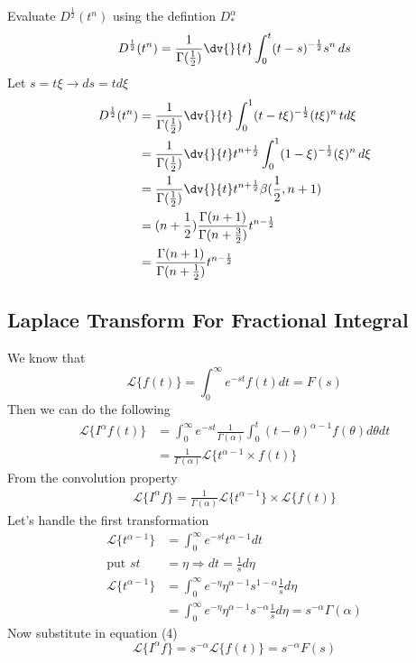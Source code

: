 \begin{example}
    Evaluate $D^{\frac{1}{2}}(t^n)$ using the defintion $D_{*}^{\alpha}$
    \[
        D^{\frac{1}{2}}(t^n) = \frac{1}{\Gamma{(\frac{1}{2})}} \dv{}{t} \int_0^t (t-s)^{-\frac{1}{2}} s^n \, ds    
    \]
    Let $s = t\xi \rightarrow ds=td\xi$
    \begin{align*}
        D^{\frac{1}{2}}(t^n) & = \frac{1}{\Gamma{(\frac{1}{2})}} \dv{}{t} \int_0^1 (t-t\xi)^{-\frac{1}{2}} (t\xi)^n \, td\xi                 \\
                             & = \frac{1}{\Gamma{(\frac{1}{2})}}  \dv{}{t} t^{n+\frac{1}{2}} \int_0^1 (1-\xi)^{-\frac{1}{2}} (\xi)^n \, d\xi \\
                             & = \frac{1}{\Gamma{(\frac{1}{2})}}  \dv{}{t} t^{n+\frac{1}{2}} \beta{(\frac{1}{2}, n+1)}                       \\
                             & = (n+\frac{1}{2}) \frac{\Gamma{(n+1)}}{\Gamma{(n+\frac{3}{2})}}      t^{n-\frac{1}{2}}                        \\
                             & = \frac{\Gamma{(n+1)}}{\Gamma{(n+\frac{1}{2})}}  t^{n-\frac{1}{2}}                                            \\
    \end{align*}
\end{example}
\newpage
\subsection{Laplace Transform For Fractional Integral}
We know that
\[
    \mathcal{L} \{f(t)\} = \int_{0}^{\infty}e^{-st}f(t)dt = F(s)
\]
Then we can do the following
\begin{align*}
    \mathcal{L}\{I^{\alpha}f(t)\} & = \int_{0}^{\infty}e^{-st}\frac{1}{\Gamma(\alpha)}\int_{0}^{t}(t-\theta)^{\alpha-1}f(\theta)d\theta dt
    \\
                                  & = \frac{1}{\Gamma(\alpha)} \mathcal{L}\{t^{\alpha-1}\times f(t)\}
\end{align*}
From the convolution property
\begin{align}
    \mathcal{L}\{I^{\alpha}f\} = \frac{1}{\Gamma(\alpha)} \mathcal{L}\{t^{\alpha-1}\}\times \mathcal{L}\{f(t)\}
\end{align}
Let's handle the first transformation
\begin{align*}
    \mathcal{L}\{t^{\alpha-1}\} & = \int_{0}^{\infty}e^{-st}t^{\alpha-1}dt
    \\
    \text{put } st              & = \eta \Longrightarrow dt = \frac{1}{s}d\eta
    \\
    \mathcal{L}\{t^{\alpha-1}\} & = \int_{0}^{\infty}e^{-\eta}\eta^{\alpha-1}s^{1-\alpha}\frac{1}{s}d\eta
    \\
                                & = \int_{0}^{\infty}e^{-\eta}\eta^{\alpha-1}s^{-\alpha}\frac{1}{s}d\eta = s^{-\alpha}\Gamma(\alpha)
\end{align*}
Now substitute in equation (4)
\[
    \mathcal{L}\{I^{\alpha}f\} = s^{-\alpha}\mathcal{L}\{f(t)\} = s^{-\alpha} F(s)
\]
